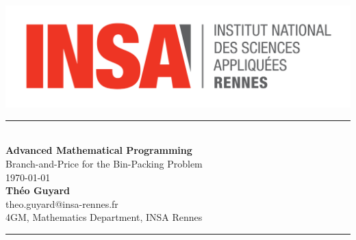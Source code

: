\begin{titlepage}
	\includegraphics[scale=0.1]{img/logo-insa.png}
	\vspace{3cm}
	\begin{center}
		\noindent\rule{\textwidth}{0.5pt} \\
		\vspace{0.5cm}
		{\Huge \textbf{Advanced Mathematical Programming}}
		\vspace{0.1cm} \\
		{\Large Branch-and-Price for the Bin-Packing Problem}
		\vspace{0.5cm} \\
		\today
		\vspace{0.5cm} \\
		\textbf{Théo Guyard}
		\vspace{0.1cm} \\
		theo.guyard@insa-rennes.fr
		\vspace{0.1cm} \\
		4GM, Mathematics Department, INSA Rennes
		\vspace{0.3cm}
		\noindent\rule{\textwidth}{1pt}
	\end{center}
	\vspace{2cm}
	\begin{abstract}
		This technical report presents a Branch-and-Price algorithm aiming to solve the Bin-Packing problem. For this algorithm, two different branching rules and three different exploration methods are implemented. A dynamic programming method able to solve the subproblems instead of using a classical LP solver is presented. Furthermore, some heuristics to be proceeded before and during the tree exploration are provided. In the first section, the main mathematical background of a BnP method suited for the Bin-Packing problem is presented. In the second section, the main structure of the BnP algorithm is presented with some details about the simplest parts. The third section presents the node processing method for the Ryan \& Foster and the Generic branching scheme. Then, the heuristics used before and during the exploration of the tree are presented. Some other method not implemented but which could have improve the algorithm are presented in the fifth section. Finally, some details about the implementation and computational results are given in the last section.
	\end{abstract}
	\vfill
\end{titlepage}